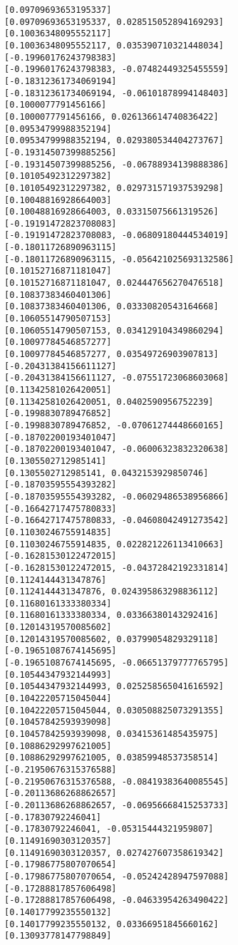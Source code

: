 \documentclass[11pt]{article}
\begin{document}
\begin{Verbatim}[commandchars=\\\{\}]
[0.09709693653195337]
[0.09709693653195337, 0.028515052894169293]
[0.10036348095552117]
[0.10036348095552117, 0.035390710321448034]
[-0.19960176243798383]
[-0.19960176243798383, -0.07482449325455559]
[-0.18312361734069194]
[-0.18312361734069194, -0.06101878994148403]
[0.1000077791456166]
[0.1000077791456166, 0.026136614740836422]
[0.09534799988352194]
[0.09534799988352194, 0.029380534404273767]
[-0.19314507399885256]
[-0.19314507399885256, -0.06788934139888386]
[0.10105492312297382]
[0.10105492312297382, 0.029731571937539298]
[0.10048816928664003]
[0.10048816928664003, 0.03315075661319526]
[-0.19191472823708083]
[-0.19191472823708083, -0.06809180444534019]
[-0.18011726890963115]
[-0.18011726890963115, -0.056421025693132586]
[0.10152716871181047]
[0.10152716871181047, 0.024447656270476518]
[0.10837383460401306]
[0.10837383460401306, 0.03330820543164668]
[0.10605514790507153]
[0.10605514790507153, 0.034129104349860294]
[0.10097784546857277]
[0.10097784546857277, 0.03549726903907813]
[-0.20431384156611127]
[-0.20431384156611127, -0.07551723068603068]
[0.11342581026420051]
[0.11342581026420051, 0.0402590956752239]
[-0.1998830789476852]
[-0.1998830789476852, -0.07061274448660165]
[-0.18702200193401047]
[-0.18702200193401047, -0.06006323832320638]
[0.1305502712985141]
[0.1305502712985141, 0.0432153929850746]
[-0.18703595554393282]
[-0.18703595554393282, -0.06029486538956866]
[-0.16642717475780833]
[-0.16642717475780833, -0.04608042491273542]
[0.11030246755914835]
[0.11030246755914835, 0.022821226113410663]
[-0.16281530122472015]
[-0.16281530122472015, -0.04372842192331814]
[0.1124144431347876]
[0.1124144431347876, 0.024395863298836112]
[0.11680161333380334]
[0.11680161333380334, 0.03366380143292416]
[0.12014319570085602]
[0.12014319570085602, 0.03799054829329118]
[-0.19651087674145695]
[-0.19651087674145695, -0.06651379777765795]
[0.10544347932144993]
[0.10544347932144993, 0.025258565041616592]
[0.10422205715045044]
[0.10422205715045044, 0.030508825073291355]
[0.10457842593939098]
[0.10457842593939098, 0.03415361485435975]
[0.10886292997621005]
[0.10886292997621005, 0.03859948537358514]
[-0.21950676315376588]
[-0.21950676315376588, -0.08419383640085545]
[-0.20113686268862657]
[-0.20113686268862657, -0.06956668415253733]
[-0.17830792246041]
[-0.17830792246041, -0.05315444321959807]
[0.11491690303120357]
[0.11491690303120357, 0.027427607358619342]
[-0.17986775807070654]
[-0.17986775807070654, -0.05242428947597088]
[-0.17288817857606498]
[-0.17288817857606498, -0.04633954263490422]
[0.14017799235550132]
[0.14017799235550132, 0.03366951845660162]
[0.13093778147798849]

\end{Verbatim}
\end{document}
